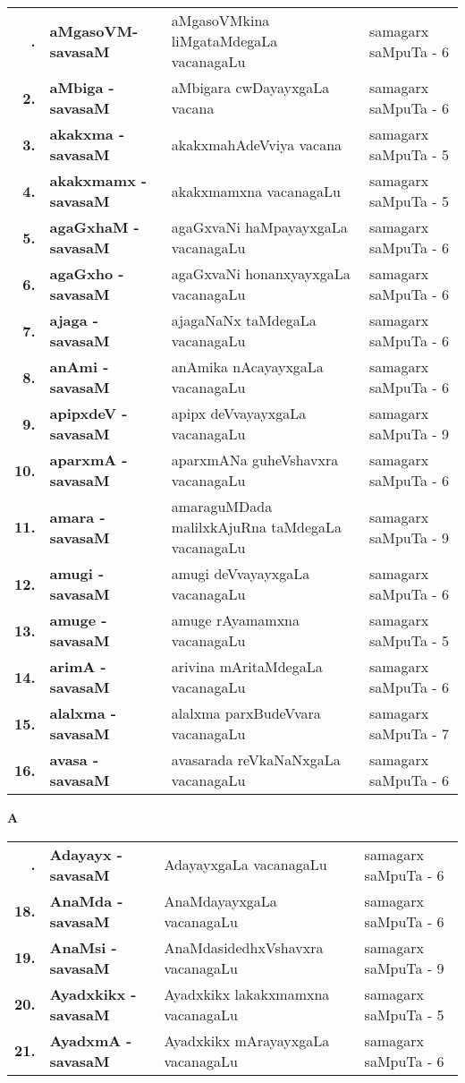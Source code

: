{\renewcommand{\arraystretch}{1.35}
\begin{longtable}{>{\bf}r>{\bf}l>{\raggedright}p{8cm}l}
\endfirsthead
\endhead
\endfoot
\endlastfoot
1. & aMgasoVM-savasaM & aMgasoVMkina liMgataMdegaLa vacanagaLu & samagarx saMpuTa - 6\\
2. & aMbiga - savasaM & aMbigara cwDayayxgaLa vacana & samagarx saMpuTa - 6 \\
3. & akakxma - savasaM & akakxmahAdeVviya vacana & samagarx saMpuTa - 5 \\
4. & akakxmamx - savasaM & akakxmamxna vacanagaLu & samagarx saMpuTa - 5 \\
5. & agaGxhaM - savasaM & agaGxvaNi haMpayayxgaLa vacanagaLu & samagarx saMpuTa - 6 \\
6. & agaGxho - savasaM & agaGxvaNi honanxyayxgaLa vacanagaLu & samagarx saMpuTa - 6 \\
7. & ajaga - savasaM & ajagaNaNx taMdegaLa vacanagaLu & samagarx saMpuTa - 6 \\
8. & anAmi - savasaM & anAmika nAcayayxgaLa vacanagaLu & samagarx saMpuTa - 6 \\
9. & apipxdeV - savasaM & apipx deVvayayxgaLa vacanagaLu & samagarx saMpuTa - 9 \\
10. & aparxmA - savasaM & aparxmANa guheVshavxra vacanagaLu & samagarx saMpuTa - 6 \\
11. & amara - savasaM & amaraguMDada malilxkAjuRna taMdegaLa vacanagaLu & samagarx saMpuTa - 9 \\
12. & amugi - savasaM & amugi deVvayayxgaLa vacanagaLu & samagarx saMpuTa - 6 \\
13. & amuge - savasaM & amuge rAyamamxna vacanagaLu & samagarx saMpuTa - 5 \\
14. & arimA - savasaM & arivina mAritaMdegaLa vacanagaLu & samagarx saMpuTa - 6 \\
15. & alalxma - savasaM & alalxma parxBudeVvara vacanagaLu & samagarx saMpuTa - 7 \\
16. & avasa - savasaM &  avasarada reVkaNaNxgaLa vacanagaLu & samagarx saMpuTa - 6
\end{longtable}}
\bigskip

\centerline{\bf A}

\medskip

{\renewcommand{\arraystretch}{1.35}
\begin{longtable}{>{\bf}r>{\bf}l>{\raggedright}p{8cm}l}
\endfirsthead
\endhead
\endfoot
\endlastfoot
17. & Adayayx - savasaM & AdayayxgaLa vacanagaLu & samagarx saMpuTa - 6\\
18. & AnaMda - savasaM & AnaMdayayxgaLa vacanagaLu & samagarx saMpuTa - 6 \\
19. & AnaMsi - savasaM & AnaMdasidedhxVshavxra vacanagaLu & samagarx saMpuTa - 9 \\
20. & Ayadxkikx - savasaM & Ayadxkikx lakakxmamxna vacanagaLu & samagarx saMpuTa - 5 \\
21. & AyadxmA - savasaM & Ayadxkikx mArayayxgaLa vacanagaLu & samagarx saMpuTa - 6
\end{longtable}}


